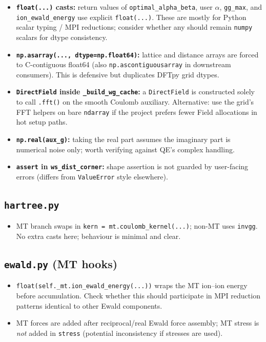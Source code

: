 \documentclass[11pt,a4paper]{article}
\begin{document}
\begin{itemize}
  \item \textbf{\texttt{float(...)} casts:} return values of
        \texttt{optimal\_alpha\_beta}, user $\alpha$, \texttt{gg\_max}, and
        \texttt{ion\_ewald\_energy} use explicit \texttt{float(...)}. These are mostly
        for Python scalar typing / MPI reductions; consider whether any should remain
        \texttt{numpy} scalars for dtype consistency.
  \item \textbf{\texttt{np.asarray(..., dtype=np.float64)}:} lattice and distance arrays
        are forced to C-contiguous float64 (also \texttt{np.ascontiguousarray} in
        downstream consumers). This is defensive but duplicates DFTpy grid dtypes.
  \item \textbf{\texttt{DirectField} inside \texttt{\_build\_wg\_cache}:} a \texttt{DirectField}
        is constructed solely to call \texttt{.fft()} on the smooth Coulomb auxiliary.
        Alternative: use the grid's FFT helpers on bare \texttt{ndarray} if the project
        prefers fewer Field allocations in hot setup paths.
  \item \textbf{\texttt{np.real(aux\_g)}:} taking the real part assumes the imaginary part
        is numerical noise only; worth verifying against QE's complex handling.
  \item \textbf{\texttt{assert} in \texttt{ws\_dist\_corner}:} shape assertion is not
        guarded by user-facing errors (differs from \texttt{ValueError} style elsewhere).
\end{itemize}

\subsection{\texttt{hartree.py}}

\begin{itemize}
  \item MT branch swaps in \texttt{kern = mt.coulomb\_kernel(...)}; non-MT uses
        \texttt{invgg}. No extra casts here; behaviour is minimal and clear.
\end{itemize}

\subsection{\texttt{ewald.py} (MT hooks)}

\begin{itemize}
  \item \texttt{float(self.\_mt.ion\_ewald\_energy(...))} wraps the MT ion--ion energy
        before accumulation. Check whether this should participate in MPI reduction
        patterns identical to other Ewald components.
  \item MT forces are added after reciprocal/real Ewald force assembly; MT stress is
        \emph{not} added in \texttt{stress} (potential inconsistency if stresses are used).
\end{itemize}
\end{document}
